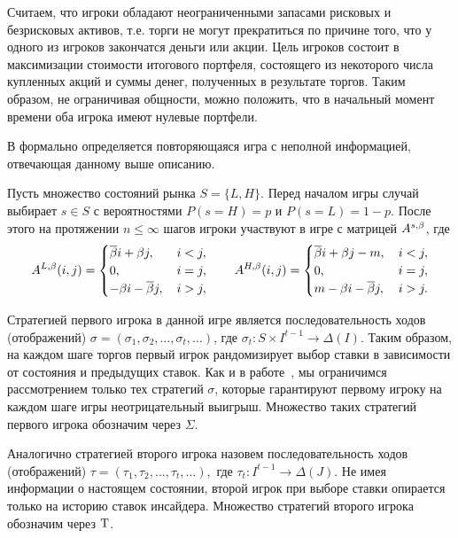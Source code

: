 Считаем, что игроки обладают неограниченными запасами рисковых и безрисковых активов, т.е. торги не могут прекратиться по причине того, что у одного из игроков закончатся деньги или акции.
Цель игроков состоит в максимизации стоимости итогового портфеля, состоящего из некоторого числа купленных акций и суммы денег, полученных в результате торгов.
Таким образом, не ограничивая общности, можно положить, что в начальный момент времени оба игрока имеют нулевые портфели.


В  формально определяется повторяющаяся игра с неполной информацией, отвечающая данному выше описанию.

Пусть множество состояний рынка $S = \{L, H\}$. Перед началом игры случай выбирает $s \in S $ с вероятностями $P(s=H) = p$ и $P(s=L) = 1 - p$.
После этого на протяжении $n \leq \infty$ шагов игроки участвуют в игре с матрицей $A^{s,\beta}$, где
\begin{equation*}
  A^{L,\beta}(i, j) = \begin{cases}
    {\overline{\beta}} i + \beta j, &\, i < j, \\
    0, &\, i = j, \\
    -\beta i - {\overline{\beta}} j, &\, i > j,
  \end{cases}
  \qquad
  A^{H,\beta}(i, j) = \begin{cases}
    {\overline{\beta}} i + \beta j - m, &\, i < j, \\
    0, &\, i = j, \\
    m - \beta i - {\overline{\beta}} j, &\, i > j.
  \end{cases}
\end{equation*}

Стратегией первого игрока в данной игре является последовательность ходов (отображений) 
$\sigma = (\sigma_1, \sigma_2, \ldots, \sigma_t, \ldots)$, где 
$\sigma_t: S \times I^{t-1} \rightarrow \Delta(I)$.
Таким образом, на каждом шаге торгов первый игрок рандомизирует выбор ставки в зависимости от состояния и предыдущих ставок.
Как и в работе~\cite{domansky07}, мы ограничимся рассмотрением только тех стратегий $\sigma$, которые гарантируют первому игроку на каждом шаге игры неотрицательный выигрыш.
Множество таких стратегий первого игрока обозначим через $\Sigma$.

Аналогично стратегией второго игрока назовем последовательность ходов (отображений) 
$\tau = (\tau_1, \tau_2, \ldots, \tau_t, \ldots),$ где 
$\tau_t: I^{t-1} \rightarrow \Delta(J)$.
Не имея информации о настоящем состоянии, второй игрок при выборе ставки опирается только на историю ставок инсайдера.
Множество стратегий второго игрока обозначим через $\mathrm{T}$.

